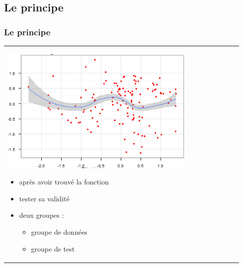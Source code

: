 \documentclass[handout]{beamer}
\begin{document}
	\subsection{Le principe}
		\begin{frame}
		\frametitle{Le principe}
		\begin{tabular}{l l}
			\begin{minipage}{0.5\textwidth}
				\begin{center}
					\includegraphics[width=0.8\textwidth]{images/function.png}
				\end{center}
			\end{minipage}

			\begin{minipage}{0.5\textwidth}
				\begin{itemize}
					\item après avoir trouvé la fonction
					\item tester sa validité
					\item deux groupes :
						\begin{itemize}
							\item groupe de données
							\item groupe de test
						\end{itemize}
				\end{itemize}
			\end{minipage}
			
		\end{tabular}
		\end{frame}
\end{document}
